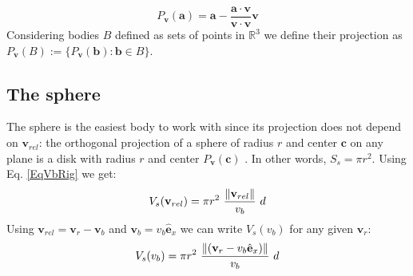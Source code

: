 \documentclass[a4paper,12pt]{article}
\begin{document}
%
\begin{equation}\label{EqPv}
P_\mathbf{v}(\mathbf{a}) = \mathbf{a} -  \frac{\mathbf{a} \cdot \mathbf{v}}{\mathbf{v} \cdot \mathbf{v}} \mathbf{v}
\end{equation} 
%
Considering bodies $B$ defined as sets of points in $\mathbb{R}^3$ we define their projection as $P_\mathbf{v}(B) := \{P_\mathbf{v}(\mathbf{b}): \mathbf{b} \in B\}$.

\subsection{The sphere}
The sphere is the easiest body to work with since its projection does not depend on $\mathbf{v}_{rel}$: the orthogonal projection of a sphere of radius $r$ and center $\mathbf{c}$ on any plane is a disk with radius $r$ and center $P_\mathbf{v}(\mathbf{c})$ \cite{Hailman}\cite{Bocci}. In other words, $S_s = \pi r^2$. Using Eq. \ref{EqVbRig} we get:
%
\begin{equation}\label{EqVs}
V_s(\mathbf{v}_{rel}) = \pi r^2\ \frac{\norm{\mathbf{v}_{rel}}}{v_b} \ d
\end{equation} 
%
%
Using $\mathbf{v}_{rel} = \mathbf{v}_r - \mathbf{v}_b$ and $\mathbf{v}_b=v_b\hat{\mathbf{e}}_x$ we can write $V_s(v_b)$ for any given $\mathbf{v}_r$:
%
\begin{equation}\label{EqVsVb}
V_s(v_b) = \pi r^2\  \frac{\norm{(\mathbf{v}_r - v_b\hat{\mathbf{e}}_x)}}{v_b} \ d
\end{equation} 
%
\end{document}
